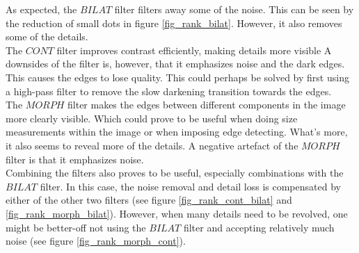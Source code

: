 As expected, the $BILAT$ filter filters away some of the noise. This can be seen by the reduction of small dots in figure \ref{fig_rank_bilat}. However, it also removes some of the details. \\
The $CONT$ filter improves contrast efficiently, making details more visible A downsides of the filter is, however, that it emphasizes noise and the dark edges. This causes the edges to lose quality. This could perhaps be solved by first using a high-pass filter to remove the slow darkening transition towards the edges. \\
The $MORPH$ filter makes the edges between different components in the image more clearly visible. Which could prove to be useful when doing size measurements within the image or when imposing edge detecting. What's more, it also seems to reveal more of the details. A negative artefact of the $MORPH$ filter is that it emphasizes noise. \\
Combining the filters also proves to be useful, especially combinations with the $BILAT$ filter. In this case, the noise removal and detail loss is compensated by either of the other two filters (see figure \ref{fig_rank_cont_bilat} and \ref{fig_rank_morph_bilat}). However, when many details need to be revolved, one might be better-off not using the $BILAT$ filter and accepting relatively much noise (see figure \ref{fig_rank_morph_cont}). 



